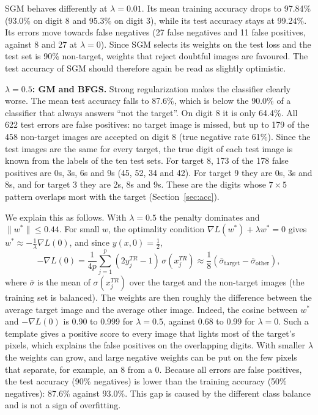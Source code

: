 SGM behaves differently at $\lambda=0.01$. Its mean training accuracy drops to 97.84\% (93.0\% on digit 8 and 95.3\% on digit 3), while its test accuracy stays at 99.24\%. Its errors move towards false negatives (27 false negatives and 11 false positives, against 8 and 27 at $\lambda=0$). Since SGM selects its weights on the test loss and the test set is 90\% non-target, weights that reject doubtful images are favoured. The test accuracy of SGM should therefore again be read as slightly optimistic.

\textbf{$\lambda=0.5$: GM and BFGS.} Strong regularization makes the classifier clearly worse. The mean test accuracy falls to 87.6\%, which is below the 90.0\% of a classifier that always answers ``not the target''. On digit 8 it is only 64.4\%. All 622 test errors are false positives: no target image is missed, but up to 179 of the 458 non-target images are accepted on digit 8 (true negative rate 61\%). Since the test images are the same for every target, the true digit of each test image is known from the labels of the ten test sets. For target 8, 173 of the 178 false positives are 0s, 3s, 6s and 9s (45, 52, 34 and 42). For target 9 they are 0s, 3s and 8s, and for target 3 they are 2s, 8s and 9s. These are the digits whose $7\times5$ pattern overlaps most with the target (Section~\ref{sec:acc}).

We explain this as follows. With $\lambda=0.5$ the penalty dominates and $\|w^*\|\le0.44$. For small $w$, the optimality condition $\nabla L(w^*)+\lambda w^*=0$ gives $w^*\approx-\frac1\lambda\nabla L(0)$, and since $y(x,0)=\frac12$,
\[
  -\nabla L(0)=\frac{1}{4p}\sum_{j=1}^{p}(2y_j^{TR}-1)\,\sigma(x_j^{TR})\approx\frac18\left(\bar\sigma_{\text{target}}-\bar\sigma_{\text{other}}\right),
\]
where $\bar\sigma$ is the mean of $\sigma(x_j^{TR})$ over the target and the non-target images (the training set is balanced). The weights are then roughly the difference between the average target image and the average other image. Indeed, the cosine between $w^*$ and $-\nabla L(0)$ is 0.90 to 0.999 for $\lambda=0.5$, against 0.68 to 0.99 for $\lambda=0$. Such a template gives a positive score to every image that lights most of the target's pixels, which explains the false positives on the overlapping digits. With smaller $\lambda$ the weights can grow, and large negative weights can be put on the few pixels that separate, for example, an 8 from a 0. Because all errors are false positives, the test accuracy (90\% negatives) is lower than the training accuracy (50\% negatives): 87.6\% against 93.0\%. This gap is caused by the different class balance and is not a sign of overfitting.

